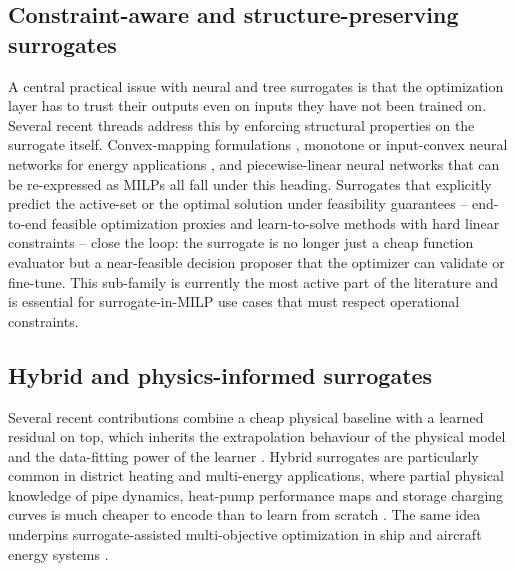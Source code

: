 
\subsection{Constraint-aware and structure-preserving surrogates}
\label{sec:tax:structured}

A central practical issue with neural and tree surrogates is that
the optimization layer has to trust their outputs even on inputs
they have not been trained on. Several recent threads address this
by enforcing structural properties on the surrogate itself.
Convex-mapping formulations
\cite{Roth2019214,Wang2020202933,Hirvonen2017323}, monotone or
input-convex neural networks for energy applications
\cite{Liu20223726,Chen2023657,Chen20244723}, and
piecewise-linear neural networks that can be re-expressed as MILPs
\cite{Wu2022231,Chen2022,Xu20223066,Lin2023} all fall under this
heading. Surrogates that explicitly predict the active-set or the
optimal solution under feasibility guarantees -- end-to-end feasible
optimization proxies \cite{Chen20244723} and learn-to-solve methods
with hard linear constraints \cite{Li202359995} -- close the loop:
the surrogate is no longer just a cheap function evaluator but a
near-feasible decision proposer that the optimizer can validate or
fine-tune. This sub-family is currently the most active part of the
literature and is essential for surrogate-in-MILP use cases that
must respect operational constraints.


\subsection{Hybrid and physics-informed surrogates}
\label{sec:tax:pinn}

Several recent contributions combine a cheap physical baseline with
a learned residual on top, which inherits the
extrapolation behaviour of the physical model and the data-fitting
power of the learner
\cite{Park2019,Liu20223726,Chen2023657,Liu20222679,Wang2021,Ren2024,Jalving2023,Zheng20231907}.
Hybrid surrogates are particularly common in district heating and
multi-energy applications, where partial physical knowledge of pipe
dynamics, heat-pump performance maps and storage charging curves is
much cheaper to encode than to learn from scratch
\cite{Schulte2016104,Petrova2025,Gao2025,Reynolds2017704,Jia2022553,Hirvonen2017323,Zhou2024}.
The same idea underpins surrogate-assisted multi-objective
optimization in ship and aircraft energy systems
\cite{Mylonopoulos202332697,Zhang2022,Zhu2024318}.

